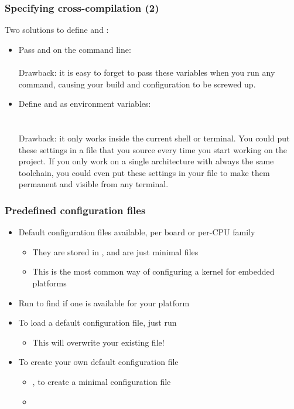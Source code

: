 \begin{frame}
  \frametitle{Specifying cross-compilation (2)}

  Two solutions to define  and :

  \begin{itemize}
  \item Pass  and  on the 
    command line: \\
     \\
    Drawback: it is easy to forget to pass these variables when
    you run any  command, causing your build and
    configuration to be screwed up.
  \item Define  and  as environment
    variables: \\
     \\
     \\
    Drawback: it only works inside the current
    shell or terminal. You could put these settings in a file
    that you source every time you start working on the project.
    If you only work on a single architecture with always the
    same toolchain, you could even put these settings in your
     file to make them permanent and visible from
    any terminal.
  \end{itemize}
\end{frame}

\begin{frame}
  \frametitle{Predefined configuration files}
  \begin{itemize}
  \item Default configuration files available, per board or per-CPU
    family
    \begin{itemize}
    \item They are stored in , and are
      just minimal  files
    \item This is the most common way of configuring a kernel for
      embedded platforms
    \end{itemize}
  \item Run  to find if one is available for your
    platform
  \item To load a default configuration file, just run\\
    \begin{itemize}
    \item This will overwrite your existing  file!
    \end{itemize}
  \item To create your own default configuration file
    \begin{itemize}
    \item {}, to create a minimal
      configuration file
    \item {}
    \end{itemize}
  \end{itemize}
\end{frame}

